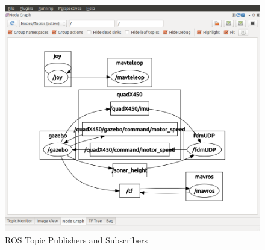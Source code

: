 \documentclass[10pt,a4paper,notitlepage]{report}
\begin{document}
\begin{figure}[h]
\includegraphics[scale=.35]{ardusitl.png}
\caption{ROS Topic Publishers and Subscribers}
\label{fig:rostopics}
\end{figure}
\end{document}
